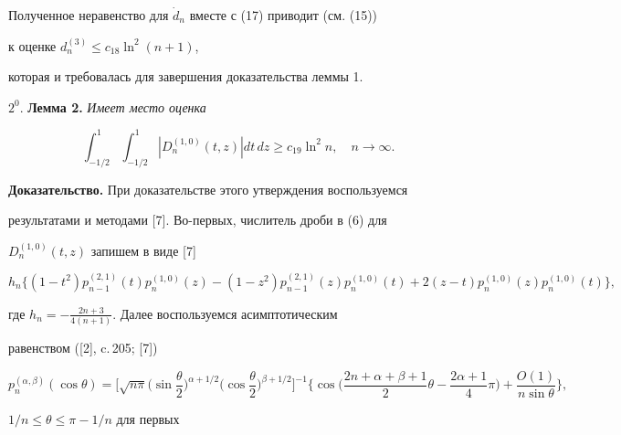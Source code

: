 Полученное неравенство для $\Dot d_n$ вместе с (17) приводит (см. (15))


к оценке $d_n^{(3)}{\le}c_{18} \ln^2 (n{+}1)$,


которая и требовалась для завершения доказательства леммы 1.


\medskip





$2^0$. {\bf Лемма 2.} {\it Имеет место оценка}


\begin{equation}


\int_{-{1}/{2}}^1\int_{-1/2}^1|


D_n^{(1,0)}(t,z)|dt\,dz \ge c_{19} \ln^2n,\quad n\to \infty.


\end{equation}





{\bf Доказательство.} При доказательстве этого утверждения воспользуемся


результатами и методами [7]. Во-первых, числитель дроби в (6) для


$D_n^{(1,0)}(t,z)$ запишем в виде [7]


\begin{equation}


h_n\{(1-t^2) p_{n-1}^{(2,1)}(t) p_n^{(1,0)}(z) -(1-z^2)


p_{n-1}^{(2,1)}(z)p_n^{(1,0)}(t)+ 2(z-t)


p_{n}^{(1,0)}(z)p_n^{(1,0)}(t)\},


\end{equation}


где $h_n=-\frac{2n+3}{4(n+1)}.$ Далее воспользуемся асимптотическим


равенством ([2], c.\,205; [7])


$$


p_n^{(\alpha,\beta)}(\cos\theta)


=\bigg[{\sqrt {n\pi}\bigg(\sin\frac{\theta}{2}\bigg)^{\alpha +1/2}


\bigg(\cos\frac{\theta}{2}\bigg)^{\beta+1/2}}\bigg]^{-1}


\bigg\{\cos\bigg(\frac{2n+\alpha+\beta+1}{2}\theta


-\frac{2\alpha+1}{4}\pi\bigg)


+\frac{O(1)}{n\sin\theta}\bigg\},


$$


${1}/{n}\le\theta\le\pi - {1}/{n}$ для первых


